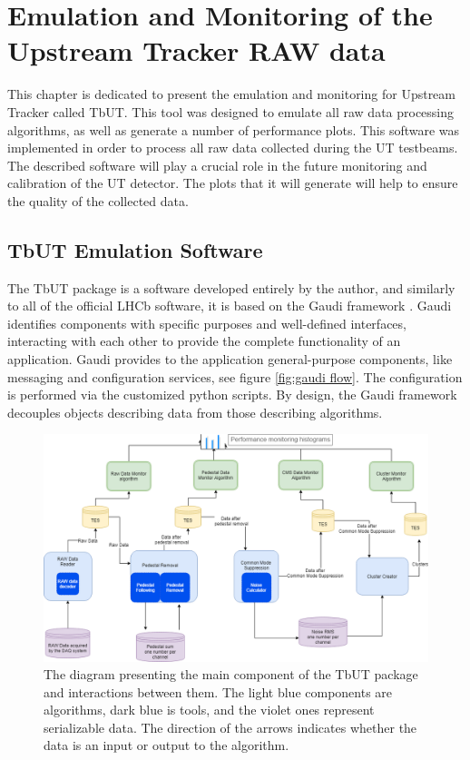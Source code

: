 \chapter{Emulation and Monitoring of the Upstream Tracker RAW data}

This chapter is dedicated to present the emulation and monitoring for Upstream Tracker called TbUT. This tool was designed to emulate all raw data processing algorithms, as well as generate a number of performance plots. This software was implemented in order to process all raw data collected during the UT testbeams. The described software will play a crucial role in the future monitoring and calibration of the UT detector. The plots that it will generate will help to ensure the quality of the collected data. 

\section{TbUT Emulation Software}
\label{chapter:tbut}
The TbUT package is a software developed entirely by the author, and similarly to all of the official LHCb software, it is based on the Gaudi framework \cite{gaudi}. Gaudi identifies components with specific purposes and well-defined interfaces, interacting with each other to provide the complete functionality of an application. Gaudi provides to the application general-purpose components, like messaging and configuration services, see figure \ref{fig:gaudi flow}. The configuration is performed via the customized python scripts. By design, the Gaudi framework decouples objects describing data from those describing algorithms.



\begin{figure}[h]
\centering
\includegraphics{figures/TBUT.png}
\caption{The diagram presenting the main component of the TbUT package and interactions between them. The light blue components are algorithms, dark blue is tools, and the violet ones represent serializable data. The direction of the arrows indicates whether the data is an input or output to the algorithm. }
\label{fig:TbUT}
\end{figure}


